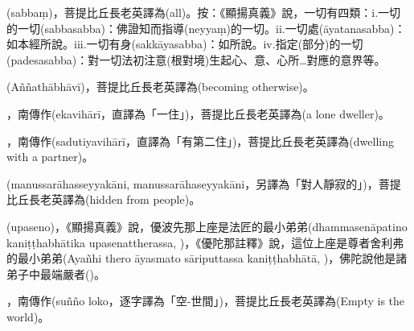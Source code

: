 \startitemgroup[noteitems]
\item{}(sabbaṃ)，菩提比丘長老英譯為(all)。按：《顯揚真義》說，一切有四類：i.一切的一切(sabbasabba)：佛證知而指導(neyyaṃ)的一切。ii.一切處(āyatanasabba)：如本經所說。iii.一切有身(sakkāyasabba)：如所說。iv.指定(部分)的一切(padesasabba)：對一切法初注意(根對境)生起心、意、心所…對應的意界等。
\stopitemgroup

\startitemgroup[noteitems]
\item{}(Aññathābhāvī)，菩提比丘長老英譯為(becoming otherwise)。
\stopitemgroup

\startitemgroup[noteitems]
\item{}，南傳作(ekavihārī，直譯為「一住」)，菩提比丘長老英譯為(a lone dweller)。
\stopitemgroup

\startitemgroup[noteitems]
\item{}，南傳作(sadutiyavihārī，直譯為「有第二住」)，菩提比丘長老英譯為(dwelling with a partner)。
\stopitemgroup

\startitemgroup[noteitems]
\item{}(manussarāhasseyyakāni, manussarāhaseyyakāni，另譯為「對人靜寂的」)，菩提比丘長老英譯為(hidden from people)。
\stopitemgroup

\startitemgroup[noteitems]
\item{}(upaseno)，《顯揚真義》說，優波先那上座是法匠的最小弟弟(dhammasenāpatino kaniṭṭhabhātika upasenattherassa, )，《優陀那註釋》說，這位上座是尊者舍利弗的最小弟弟(Ayañhi thero āyasmato sāriputtassa kaniṭṭhabhātā, )，佛陀說他是諸弟子中最端嚴者()。
\stopitemgroup

\startitemgroup[noteitems]
\item{}，南傳作(suñño loko，逐字譯為「空-世間」)，菩提比丘長老英譯為(Empty is the world)。
\stopitemgroup

